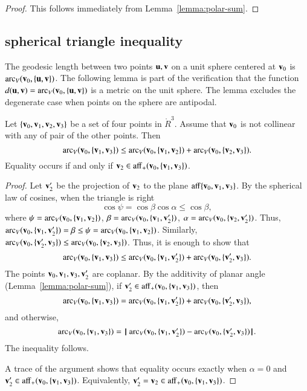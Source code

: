 \begin{proof} This follows immediately from 
Lemma~\ref{lemma:polar-sum}.
\end{proof}


\subsection{spherical triangle inequality} %
%
%

The geodesic length between two points
$\u,\v$ on a unit sphere centered at $\v_0$ is $\arc_V(\v_0,\{\u,\v\})$.
The following lemma is part of the verification that
the function $d(\u,\v) = \arc_V(\v_0,\{\u,\v\})$ is a metric
on the unit sphere.  The lemma excludes the degenerate case when
points on the sphere are antipodal.
%

\begin{lemma}[]\label{lemma:sph-tri-ineq}
Let $\{\v_0,\v_1,\v_2,\v_3\}$ be a set of four points in $\ring{R}^3$.
Assume that $\v_0$ is not collinear with any of pair of the other points.
Then
\[ 
  \arc_V(\v_0,\{\v_1,\v_3\}) \le \arc_V(\v_0,\{\v_1,\v_2\}) + \arc_V(\v_0,\{\v_2,\v_3\}).
\] 
Equality occurs if and only if $\v_2\in\op{aff}_+(\v_0,\{\v_1,\v_3\})$.
\end{lemma}

\begin{proof} Let $\v_2'$ be the projection of $\v_2$ to the plane
$\op{aff}\{\v_0,\v_1,\v_3\}$.  
By the spherical law of cosines, when the triangle is right
\[ 
\cos\psi = \cos\beta\cos\alpha \le \cos\beta,
\] 
where $\psi = \arc_V(\v_0,\{\v_1,\v_2\})$, $\beta =
\arc_V(\v_0,\{\v_1,\v_2'\})$, $\alpha=\arc_V(\v_0,\{\v_2,\v_2'\})$.  Thus,
$\arc_V(\v_0,\{\v_1,\v_2'\})=\beta\le \psi=\arc_V(\v_0,\{\v_1,\v_2\})$.
Similarly, $\arc_V(\v_0,\{\v_2',\v_3\}) \le \arc_V(\v_0,\{\v_2,\v_3\})$.
Thus, it is enough to show that
\[ 
  \arc_V(\v_0,\{\v_1,\v_3\}) \le \arc_V(\v_0,\{\v_1,\v_2'\}) + \arc_V(\v_0,\{\v_2',\v_3\}).
\] 
The points $\v_0,\v_1,\v_3,\v_2'$ are coplanar.
By the additivity of planar angle (Lemma~\ref{lemma:polar-sum}), if 
$\v_2'\in \op{aff}_+(\v_0,\{\v_1,\v_3\})$, then
\[ 
  \arc_V(\v_0,\{\v_1,\v_3\}) = \arc_V(\v_0,\{\v_1,\v_2'\}) + \arc_V(\v_0,\{\v_2',\v_3\}),   
\] 
and otherwise,
\[ 
  \arc_V(\v_0,\{\v_1,\v_3\}) = \norm{\arc_V(\v_0,\{\v_1,\v_2'\}) }{ \arc_V(\v_0,\{\v_2',\v_3\})}.
\] 
The inequality follows.

A trace of the argument shows that equality occurs exactly when
$\alpha=0$ and $\v_2'\in \op{aff}_+(\v_0,\{\v_1,\v_3\})$.  Equivalently,
$\v_2'=\v_2\in\op{aff}_+(\v_0,\{\v_1,\v_3\})$.
\end{proof}

